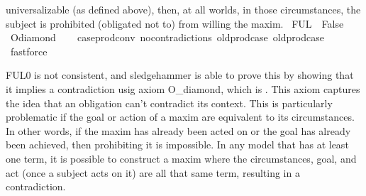 \begin{isabellebody}
{universalizable (as defined above), then, at all worlds, in those circumstances, the subject 
is prohibited (obligated not to) from willing the maxim.%
}\isanewline
\isanewline
{}\isamarkupfalse%
\ {\isachardoublequoteopen}FUL{}\ {\isasymlongrightarrow}\ False{\isachardoublequoteclose}%
\isadelimproof
\ %
\endisadelimproof
%
\isatagproof
{}\isamarkupfalse%
\ O{\isacharunderscore}diamond\isanewline
\ \ \isamarkupfalse%
\ case{\isacharunderscore}prod{\isacharunderscore}conv\ no{\isacharunderscore}contradictions\ old{\isachardot}prod{\isachardot}case\ old{\isachardot}prod{\isachardot}case\ \isamarkupfalse%
\ fastforce%
\endisatagproof
{\isafoldproof}%
%
\isadelimproof
%
\endisadelimproof
%
\begin{isamarkuptext}%
FUL0 is not consistent, and sledgehammer is able to prove this by showing that it implies a contradiction 
usig axiom O\_diamond, which is . This axiom captures 
the idea that an obligation can't contradict its context. This is particularly problematic if the goal or 
action of a maxim are equivalent to its circumstances. In other words, if the maxim has already been 
acted on or the goal has already been achieved, then prohibiting it is impossible. 
In any model that has at least one term, it is possible to construct a maxim where the circumstances, goal, 
and act (once a subject acts on it) are all that same term, resulting in a contradiction. 


\end{isamarkuptext}
\end{isabellebody}
